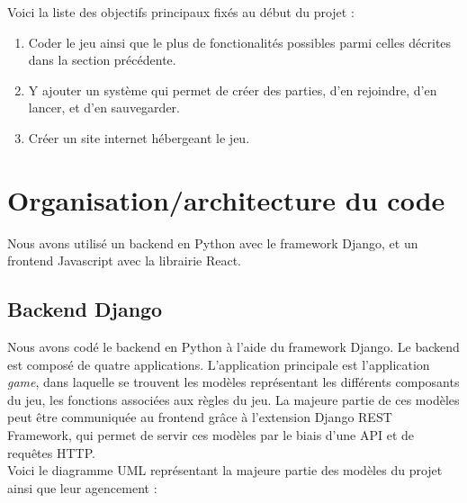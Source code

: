\documentclass[12pt,twoside,a4paper]{article}
\begin{document}
\noindent Voici la liste des objectifs principaux fix\'es au d\'ebut du projet :

\begin{enumerate}
\item Coder le jeu ainsi que le plus de fonctionalit\'es possibles parmi celles d\'ecrites dans la section pr\'ec\'edente.
\item Y ajouter un syst\`eme qui permet de cr\'eer des parties, d'en rejoindre, d'en lancer, et d'en sauvegarder. 
\item Cr\'eer un site internet h\'ebergeant le jeu.
\end{enumerate}

\section{Organisation/architecture du code}

Nous avons utilis\'e un backend en Python avec le framework Django, et un frontend Javascript avec la librairie React.

\subsection{Backend Django}

Nous avons cod\'e le backend en Python \`a l'aide du framework Django. Le backend est compos\'e de quatre applications. L'application principale est l'application \textit{game}, dans laquelle se trouvent les mod\`eles repr\'esentant les diff\'erents composants du jeu,  les fonctions associ\'ees aux r\`egles du jeu. La majeure partie de ces modèles peut être communiquée au frontend grâce à l'extension Django REST Framework, qui permet de servir ces modèles par le biais d'une API et de requêtes HTTP.\\

Voici le diagramme UML repr\'esentant la majeure partie des mod\`eles du projet ainsi que leur agencement :
\end{document}
